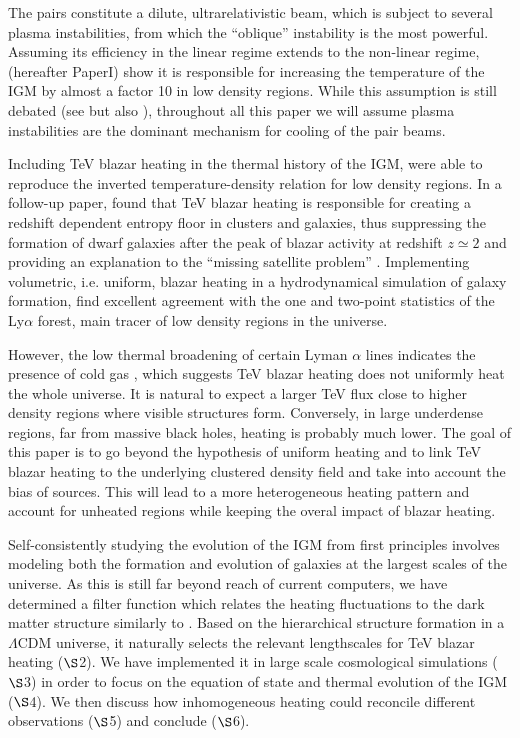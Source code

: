 \documentclass[twocolumns]{emulateapj}
\begin{document}
The pairs constitute a dilute, ultrarelativistic beam, which is subject to several plasma instabilities, from which the ``oblique'' instability \citep{PhysRevE.70.046401} is the most powerful. Assuming its efficiency in the linear regime extends to the non-linear regime, \citet{2012ApJ...752...23C} (hereafter PaperI) show it is responsible for increasing the temperature of the IGM by almost a factor 10 in low density regions. While this assumption is still debated (see \citet{2013ApJ...770...54M,2014ApJ...787...49S} but also \citet{2013ApJ...777...49S,2012ApJ...758..102S,Chang15}), throughout all this paper we will assume plasma instabilities are the dominant mechanism for cooling of the pair beams.


Including TeV blazar heating in the thermal history of the IGM, \citet{2012ApJ...752...23C} were able to reproduce the inverted temperature-density relation for low density regions. In a follow-up paper, \citet{2012ApJ...752...24P} found that TeV blazar heating is responsible for creating  a redshift dependent entropy floor in clusters and galaxies, thus suppressing the formation of dwarf galaxies after the peak of blazar activity at redshift $z\simeq2$ and providing an explanation to the ``missing satellite problem'' \citep{2010AdAst2010E...8K}. Implementing volumetric, i.e. uniform, blazar heating in a hydrodynamical simulation of galaxy formation, \citet{2012MNRAS.423..149P} find excellent agreement with the one and two-point statistics of the Ly$\alpha$ forest, main tracer of low density regions in the universe.

However, the low thermal broadening of certain Lyman $\alpha$ lines indicates the presence of cold gas \citep{2012ApJ...757L..30R}, which suggests TeV blazar heating does not uniformly heat the whole universe.  It is natural to expect a larger TeV flux close to higher density regions where visible structures form. Conversely, in large underdense regions, far from massive black holes, heating is probably much lower. The goal of this paper is to go beyond the hypothesis of uniform heating and to link TeV blazar heating to the underlying clustered density field and take into account the bias of sources. This will lead to a more heterogeneous heating pattern and account for unheated regions while keeping the overal impact of blazar heating.


Self-consistently studying the evolution of the IGM from first principles involves modeling both the formation and evolution of galaxies  at the largest scales of the universe. As this is still far beyond reach of current computers, we have determined a filter function which relates the heating fluctuations to the dark matter structure similarly to \citet{2007MNRAS.376.1680P,2005ApJ...626....1B,2014PhRvD..89h3010P}. Based on the hierarchical structure formation in a $\Lambda$CDM universe, it naturally selects the relevant lengthscales for TeV blazar heating ($\S$2). We have implemented it in large scale cosmological simulations ($\S$3) in order to  focus on the equation of state and thermal evolution of the  IGM ($\S$4). We then discuss how inhomogeneous heating could reconcile different observations ($\S$5)  and conclude ($\S$6).
\end{document}
